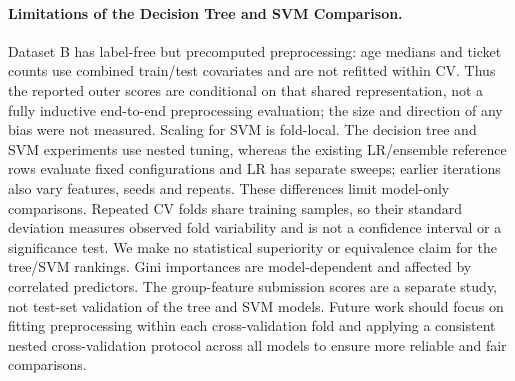 \documentclass[10pt,twocolumn]{article}
\begin{document}
\paragraph{Limitations of the Decision Tree and SVM Comparison.} Dataset B has label-free but precomputed preprocessing: age medians and ticket counts use combined train/test covariates and are not refitted within CV. Thus the reported outer scores are conditional on that shared representation, not a fully inductive end-to-end preprocessing evaluation; the size and direction of any bias were not measured. Scaling for SVM is fold-local. The decision tree and SVM experiments use nested tuning, whereas the existing LR/ensemble reference rows evaluate fixed configurations and LR has separate sweeps; earlier iterations also vary features, seeds and repeats. These differences limit model-only comparisons. Repeated CV folds share training samples, so their standard deviation measures observed fold variability and is not a confidence interval or a significance test. We make no statistical superiority or equivalence claim for the tree/SVM rankings. Gini importances are model-dependent and affected by correlated predictors. The group-feature submission scores are a separate study, not test-set validation of the tree and SVM models. Future work should focus on fitting preprocessing within each cross-validation fold and applying a consistent nested cross-validation protocol across all models to ensure more reliable and fair comparisons.
\end{document}
